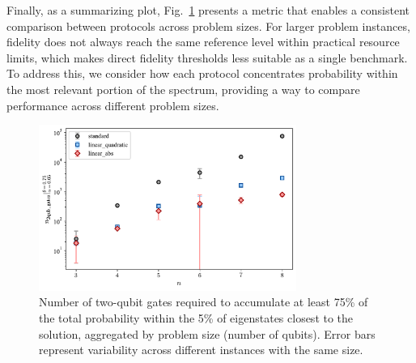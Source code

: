 Finally, as a summarizing plot, Fig.~\ref{fig:accumulated_probability} presents a metric that enables a consistent comparison between protocols across problem sizes. For larger problem instances, fidelity does not always reach the same reference level within practical resource limits, which makes direct fidelity thresholds less suitable as a single benchmark. To address this, we consider how each protocol concentrates probability within the most relevant portion of the spectrum, providing a way to compare performance across different problem sizes.

\begin{figure}[h]
    \centering
    \includegraphics[width=0.75\textwidth]{04-results/figs/accumulated_probability.pdf}
    \caption{Number of two-qubit gates required to accumulate at least 75\% of the total probability
    within the 5\% of eigenstates closest to the solution, aggregated by problem size (number of qubits).
    Error bars represent variability across different instances with the same size.}
    \label{fig:accumulated_probability}
\end{figure}